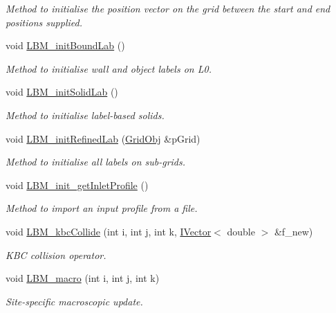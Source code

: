 \begin{DoxyCompactItemize}
\begin{DoxyCompactList}\small\item\em Method to initialise the position vector on the grid between the start and end positions supplied. \end{DoxyCompactList}\item 
void \hyperlink{class_grid_obj_a4b6edceeda49496365e725eb67931961}{L\+B\+M\+\_\+init\+Bound\+Lab} ()
\begin{DoxyCompactList}\small\item\em Method to initialise wall and object labels on L0. \end{DoxyCompactList}\item 
void \hyperlink{class_grid_obj_a5dd08730d7cdea576bb4b337786a9bcf}{L\+B\+M\+\_\+init\+Solid\+Lab} ()
\begin{DoxyCompactList}\small\item\em Method to initialise label-\/based solids. \end{DoxyCompactList}\item 
void \hyperlink{class_grid_obj_a3ba133d06625fb576ca0909b946033b2}{L\+B\+M\+\_\+init\+Refined\+Lab} (\hyperlink{class_grid_obj}{Grid\+Obj} \&p\+Grid)
\begin{DoxyCompactList}\small\item\em Method to initialise all labels on sub-\/grids. \end{DoxyCompactList}\item 
void \hyperlink{class_grid_obj_a023713976673d029103690a91c5415f9}{L\+B\+M\+\_\+init\+\_\+get\+Inlet\+Profile} ()
\begin{DoxyCompactList}\small\item\em Method to import an input profile from a file. \end{DoxyCompactList}\item 
void \hyperlink{class_grid_obj_ac4ca0327a53171fe8e1c3076e9f1353f}{L\+B\+M\+\_\+kbc\+Collide} (int i, int j, int k, \hyperlink{class_i_vector}{I\+Vector}$<$ double $>$ \&f\+\_\+new)
\begin{DoxyCompactList}\small\item\em K\+BC collision operator. \end{DoxyCompactList}\item 
void \hyperlink{class_grid_obj_ab69942450175d12c75f4b8d33b06c905}{L\+B\+M\+\_\+macro} (int i, int j, int k)
\begin{DoxyCompactList}\small\item\em Site-\/specific macroscopic update. \end{DoxyCompactList}\item 

\end{DoxyCompactItemize}

